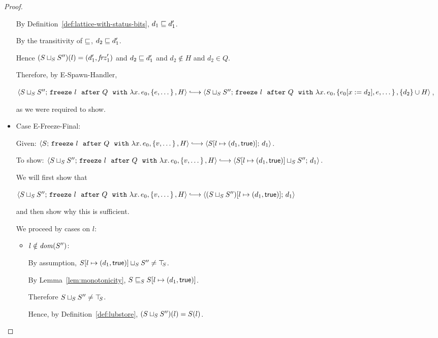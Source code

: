 \begin{proof}
\begin{itemize}
      By Definition~\ref{def:lattice-with-status-bits}, $d_1 \sqsubseteq
      d'_1$.

      By the transitivity of $\sqsubseteq$, $d_2 \sqsubseteq d'_1$.

      Hence $(S \sqcup_{S} S'')(l) =
      (d'_1, \mathit{frz}'_1)$ and $d_2 \sqsubseteq d'_1$ and $d_2 \notin
      H$ and $d_2 \in Q$.

      Therefore, by {\sc E-Spawn-Handler},

      $\config{\lubstore{S}{S''}}{\freezeafterfull{l}{Q}{\lam{x}{e_0}}{\setof{e,
            \dots}}{H}} \parstepsto
      \config{\lubstore{S}{S''}}{\freezeafterfull{l}{Q}{\lam{x}{e_0}}{\setof{\subst{e_0}{x}{d_2},
            e, \dots}} {\{d_2\}\cup H}}$,

      as we were required to show.

    \item Case {\sc E-Freeze-Final}:


      Given:
      $\config{S}{\freezeafterfull{l}{Q}{\lam{x}{e_0}}{\setof{v,
            \dots}}{H}} \parstepsto
      \config{\extS{S}{l}{d_1}{\frozentrue}}{d_1}$.

      To show:
      $\config{\lubstore{S}{S''}}{\freezeafterfull{l}{Q}{\lam{x}{e_0}}{\setof{v,
            \dots}}{H}} \parstepsto
      \config{\lubstore{\extS{S}{l}{d_1}{\frozentrue}}{S''}}{d_1}$.

      We will first show that

      $\config{\lubstore{S}{S''}}{\freezeafterfull{l}{Q}{\lam{x}{e_0}}{\setof{v,
            \dots}}{H}} \parstepsto
      \config{\extS{(\lubstore{S}{S''})}{l}{d_1}{\frozentrue}}{d_1}$

      and then show why this is sufficient.

      We proceed by cases on $l$:
      \begin{itemize}
      \item $l \notin \mathit{dom}(S'')$:

        By assumption, $S[l \mapsto (d_1, \textsf{true})] \sqcup_{S} S''
        \neq \top\hspace{-0.85mm}_{S}$.

        By Lemma~\ref{lem:monotonicity},
        $S \sqsubseteq_S S[l \mapsto (d_1, \textsf{true})]$.

        Therefore $S \sqcup_{S} S'' \neq \top\hspace{-0.85mm}_{S}$.

        Hence, by Definition~\ref{def:lubstore},
        $(S \sqcup_{S} S'')(l) = S(l)$.


\end{itemize}
\end{itemize}
\end{proof}
